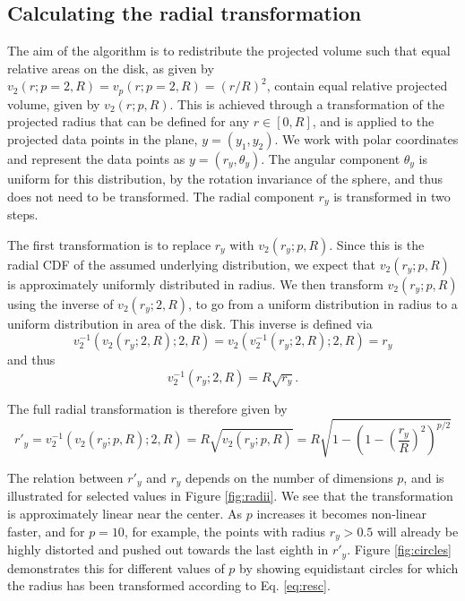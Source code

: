 \documentclass[]{interact}
\theoremstyle{plain}%
\theoremstyle{definition}
\theoremstyle{remark}
\begin{document}
\hypertarget{calculating-the-radial-transformation}{%
\subsection{Calculating the radial
transformation}\label{calculating-the-radial-transformation}}

The aim of the algorithm is to redistribute the projected volume such
that equal relative areas on the disk, as given by
\(v_{2} (r; p=2, R)= v_p(r; p=2, R) = (r/R)^2\), contain equal relative
projected volume, given by \(v_{2} (r; p, R)\). This is achieved through
a transformation of the projected radius that can be defined for any
\(r\in[0,R]\), and is applied to the projected data points in the plane,
\(y = (y_1, y_2)\). We work with polar coordinates and represent the
data points as \(y = (r_y, \theta_y)\). The angular component
\(\theta_y\) is uniform for this distribution, by the rotation
invariance of the sphere, and thus does not need to be transformed. The
radial component \(r_y\) is transformed in two steps.

The first transformation is to replace \(r_y\) with
\(v_{2} (r_y; p, R)\). Since this is the radial CDF of the assumed
underlying distribution, we expect that \(v_{2} (r_y; p, R)\) is
approximately uniformly distributed in radius. We then transform
\(v_{2} (r_y; p, R)\) using the inverse of \(v_{2} (r_y; 2, R)\), to go
from a uniform distribution in radius to a uniform distribution in area
of the disk. This inverse is defined via \begin{equation}
v_2^{-1}(v_2(r_y; 2, R); 2, R) = v_2(v_2^{-1}(r_y; 2, R); 2, R) = r_y
\end{equation} and thus \begin{equation}
v_2^{-1}(r_y; 2, R) = R \sqrt{r_y}.
\end{equation}

The full radial transformation is therefore given by \begin{equation}
r'_y = v_2^{-1} (v_2(r_y; p, R); 2, R) =  R \sqrt{v_2(r_y; p, R)} = R \sqrt{1-\left(1-\left(\frac{r_y}{R}\right)^2\right)^{p/2}}
\label{eq:resc}
\end{equation}

The relation between \(r'_y\) and \(r_y\) depends on the number of
dimensions \(p\), and is illustrated for selected values in Figure
\ref{fig:radii}. We see that the transformation is approximately linear
near the center. As \(p\) increases it becomes non-linear faster, and
for \(p=10\), for example, the points with radius \(r_y>0.5\) will
already be highly distorted and pushed out towards the last eighth in
\(r'_y\). Figure \ref{fig:circles} demonstrates this for different
values of \(p\) by showing equidistant circles for which the radius has
been transformed according to Eq. \ref{eq:resc}.
\end{document}
